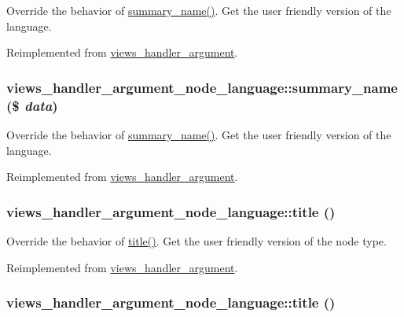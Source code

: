 Override the behavior of \hyperlink{classviews__handler__argument__node__language_a07770dbbc40710c5369f76f4d4b6a35}{summary\_\-name()}. Get the user friendly version of the language. 

Reimplemented from \hyperlink{classviews__handler__argument_4c55a340453eed4d35c69f7ac790cac1}{views\_\-handler\_\-argument}.\hypertarget{classviews__handler__argument__node__language_a07770dbbc40710c5369f76f4d4b6a35}{
\subsubsection[{summary\_\-name}]{\setlength{\rightskip}{0pt plus 5cm}views\_\-handler\_\-argument\_\-node\_\-language::summary\_\-name (\$ {\em data})}}
\label{classviews__handler__argument__node__language_a07770dbbc40710c5369f76f4d4b6a35}


Override the behavior of \hyperlink{classviews__handler__argument__node__language_a07770dbbc40710c5369f76f4d4b6a35}{summary\_\-name()}. Get the user friendly version of the language. 

Reimplemented from \hyperlink{classviews__handler__argument_4c55a340453eed4d35c69f7ac790cac1}{views\_\-handler\_\-argument}.\hypertarget{classviews__handler__argument__node__language_b880be769744ec720d0b8e2e32671daa}{
\subsubsection[{title}]{\setlength{\rightskip}{0pt plus 5cm}views\_\-handler\_\-argument\_\-node\_\-language::title ()}}
\label{classviews__handler__argument__node__language_b880be769744ec720d0b8e2e32671daa}


Override the behavior of \hyperlink{classviews__handler__argument__node__language_b880be769744ec720d0b8e2e32671daa}{title()}. Get the user friendly version of the node type. 

Reimplemented from \hyperlink{classviews__handler__argument_76181ac24e7be4a09aaafc1fa5f15ea1}{views\_\-handler\_\-argument}.\hypertarget{classviews__handler__argument__node__language_b880be769744ec720d0b8e2e32671daa}{
\subsubsection[{title}]{\setlength{\rightskip}{0pt plus 5cm}views\_\-handler\_\-argument\_\-node\_\-language::title ()}}
\label{classviews__handler__argument__node__language_b880be769744ec720d0b8e2e32671daa}


